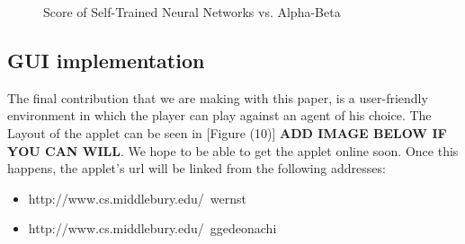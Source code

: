 \documentclass{sig-alternate-05-2015}
\begin{document}
\begin{figure}[p]
\centering
{}
\caption{Score of Self-Trained Neural Networks vs. Alpha-Beta}
\label{fig:graph5}
\end{figure}

\subsection{GUI implementation}
	The final contribution that we are making with this paper, is a user-friendly environment in which the player can play against an agent of his choice. The Layout of the applet can be seen in [Figure (10)] \textbf{ADD IMAGE BELOW IF YOU CAN WILL}. We hope to be able to get the applet online soon. Once this happens, the applet's url will be linked from the following addresses:

\begin{itemize}
\itemsep0em 
\item http://www.cs.middlebury.edu/~wernst
\item http://www.cs.middlebury.edu/~ggedeonachi
\end{itemize}
\end{document}
